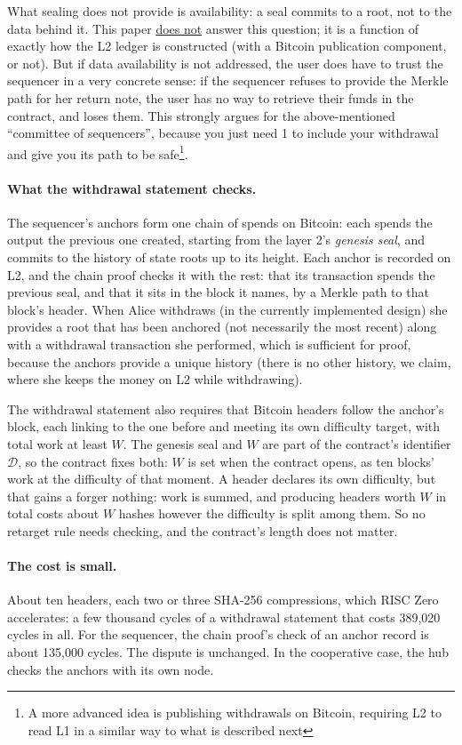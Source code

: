 \documentclass[11pt]{article}
\begin{document}
What sealing does not provide is availability: a seal commits to a root, not to the data behind it. This paper \underline{does not} answer this question; it is a function of exactly how the L2 ledger is constructed (with a Bitcoin publication component, or not). But if data availability is not addressed, the user does have to trust the sequencer in a very concrete sense: if the sequencer refuses to provide the Merkle path for her return note, the user has no way to retrieve their funds in the contract, and loses them. This strongly argues for the above-mentioned ``committee of sequencers'', because you just need 1 to include your withdrawal and give you its path to be safe\footnote{A more advanced idea is publishing withdrawals on Bitcoin, requiring L2 to read L1 in a similar way to what is described next}.

\paragraph{What the withdrawal statement checks.} The sequencer's
anchors form one chain of spends on Bitcoin: each spends the output the
previous one created, starting from the layer 2's \emph{genesis seal},
and commits to the history of state roots up to its height. Each anchor
is recorded on L2, and the chain proof
checks it with the rest: that its transaction spends the previous seal, and
that it sits in the block it names, by a Merkle path to that block's
header. 
When Alice withdraws (in the currently implemented design) she provides a root that has been anchored (not necessarily the most recent) along with a withdrawal transaction she performed, which is sufficient for proof, because the anchors provide a unique history (there is no other history, we claim, where she keeps the money on L2 while withdrawing).

The withdrawal
statement also requires that Bitcoin headers follow the anchor's block, each
linking to the one before and meeting its own difficulty target, with
total work at least $W$. The genesis seal and $W$ are part of the
contract's identifier $\mathcal{D}$, so the contract fixes both: $W$
is set when the contract opens, as ten blocks' work at the difficulty of
that moment. A header declares its own difficulty, but that gains a
forger nothing: work is summed, and producing headers worth $W$ in total
costs about $W$ hashes however the difficulty is split among them. So
no retarget rule needs checking, and the contract's length does not
matter.

\paragraph{The cost is small.} About ten headers, each two or three
SHA-256 compressions, which RISC Zero accelerates: a few thousand cycles
of a withdrawal statement that costs 389,020 cycles in all. For the
sequencer, the chain proof's check of an anchor record is about 135,000
cycles. The dispute is unchanged. In the cooperative case, the hub
checks the anchors with its own node.
\end{document}

